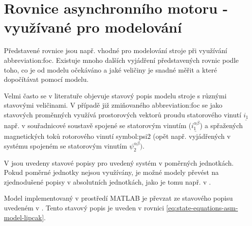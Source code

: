 \documentclass[a4paper, twoside, 11pt]{article}
\begin{document}
\section{Rovnice asynchronního motoru - využívané pro modelování}
Představené rovnice jsou např. vhodné pro modelování stroje při využívání \gls{abbreviation:foc}. Existuje mnoho dalších vyjádření představených rovnic podle toho, co je od modelu očekáváno a jaké veličiny je snadné měřit a které dopočítávat pomocí modelu.\par
Velmi často se v literatuře objevuje stavový popis modelu stroje s různými stavovými veličinami. V případě již zmiňovaného \gls{abbreviation:foc} se jako stavových proměnných využívá prostorových vektorů proudu statorového vinutí $\underline{i_1}$ např. v souřadnicové soustavě spojené se statorovým vinutím ($\underline{i_1^{\alpha\beta}}$) a spřažených magnetických toků rotorového vinutí \gls{symbol:psi2} (opět např. vyjádřených v systému spojeném se statorovým vinutím $\psi_2^{\alpha\beta})$.\par
V \cite{popescu-induction-motor-modelling-for-vector-control-purposes} jsou uvedeny stavové popisy pro uvedený systém v poměrných jednotkách. Pokud poměrné jednotky nejsou využívány, je možné modely převést na zjednodušené popisy v absolutních jednotkách, jako je tomu např. v \cite{lipcak-bauer-ept-moodle}.\par
Model implementovaný v prostředí MATLAB je převzat ze stavového popisu uvedeném v \cite{lipcak-bauer-ept-moodle}. Tento stavový popis je uveden v rovnici \ref{eq:state-equations-asm-model-lipcak}. 
\end{document}
